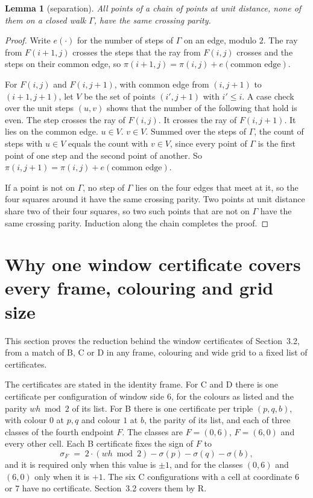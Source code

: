 \documentclass[11pt]{article}
\newtheorem{lemma}{Lemma}
\begin{document}
\begin{lemma}[separation]\label{lem:sep}
All points of a chain of points at unit distance, none of them on a closed walk $\Gamma$, have the
same crossing parity.
\end{lemma}
\begin{proof}
Write $e(\cdot)$ for the number of steps of $\Gamma$ on an edge, modulo $2$. The ray from $F(i+1,j)$
crosses the steps that the ray from $F(i,j)$ crosses and the steps on their common edge, so
$\pi(i+1,j)=\pi(i,j)+e(\text{common edge})$.

For $F(i,j)$ and $F(i,j+1)$, with common edge from $(i,j+1)$ to $(i+1,j+1)$, let $V$ be the set
of points $(i',j+1)$ with $i'\le i$. A case check over the unit steps $(u,v)$ shows that the number
of the following that hold is even. The step crosses the ray of $F(i,j)$. It crosses the ray of
$F(i,j+1)$. It lies on the common edge. $u\in V$. $v\in V$. Summed over the steps of $\Gamma$, the
count of steps with $u\in V$ equals the count with $v\in V$, since every point of $\Gamma$ is the
first point of one step and the second point of another. So
$\pi(i,j+1)=\pi(i,j)+e(\text{common edge})$.

If a point is not on $\Gamma$, no step of $\Gamma$ lies on the four edges that meet at it, so the
four squares around it have the same crossing parity. Two points at unit distance share two of
their four squares, so two such points that are not on $\Gamma$ have the same crossing parity.
Induction along the chain completes the proof.
\end{proof}

\section{Why one window certificate covers every frame, colouring and grid size}\label{sec:transfer}

This section proves the reduction behind the window certificates of Section~3.2, from a match of
B, C or D in any frame, colouring and wide grid to a fixed list of certificates.

The certificates are stated in the identity frame. For C and D there is one certificate per
configuration of window side $6$, for the colours as listed and the parity $wh \bmod 2$ of its list.
For B there is one certificate per triple $(p,q,b)$, with colour $0$ at $p,q$ and colour $1$ at $b$,
the parity of its list, and each of three classes of the fourth endpoint $F$. The classes are
$F=(0,6)$, $F=(6,0)$ and every other cell. Each B certificate fixes the sign of $F$ to
\[
\sigma_F \;=\; 2\cdot(wh \bmod 2) - \sigma(p) - \sigma(q) - \sigma(b),
\]
and it is required only when this value is $\pm 1$, and for the classes $(0,6)$ and $(6,0)$ only
when it is $+1$. The six C configurations with a cell at coordinate $6$ or $7$ have no certificate.
Section~3.2 covers them by R.
\end{document}
